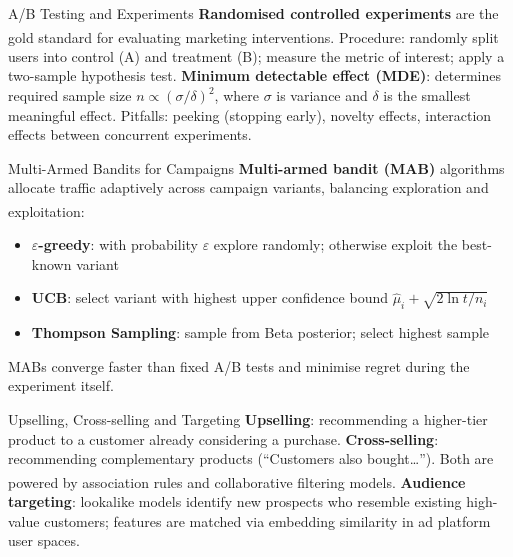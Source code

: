 \begin{v3topic}{A/B Testing and Experiments}
    \textbf{Randomised controlled experiments} are the gold standard for evaluating marketing interventions\textsuperscript{\cite[][pp.~178--183]{chaffeyDigitalBusinessECommerce2019}}.
    Procedure: randomly split users into control (A) and treatment (B); measure the metric of interest; apply a two-sample hypothesis test.
    \textbf{Minimum detectable effect (MDE)}: determines required sample size $n \propto (\sigma / \delta)^2$, where $\sigma$ is variance and $\delta$ is the smallest meaningful effect.
    Pitfalls: peeking (stopping early), novelty effects, interaction effects between concurrent experiments.

\end{v3topic}
\begin{v3topic}{Multi-Armed Bandits for Campaigns}
    \textbf{Multi-armed bandit (MAB)} algorithms allocate traffic adaptively across campaign variants, balancing exploration and exploitation\textsuperscript{\cite[][pp.~458--462]{suttonReinforcementLearningIntroduction2018}}:
    \begin{itemize}
        \item \textbf{$\varepsilon$-greedy}: with probability $\varepsilon$ explore randomly; otherwise exploit the best-known variant
        \item \textbf{UCB}: select variant with highest upper confidence bound $\hat{\mu}_i + \sqrt{2\ln t / n_i}$
        \item \textbf{Thompson Sampling}: sample from Beta posterior; select highest sample
    \end{itemize}
    MABs converge faster than fixed A/B tests and minimise regret during the experiment itself.

\end{v3topic}
\begin{v3topic}{Upselling, Cross-selling and Targeting}
    \textbf{Upselling}: recommending a higher-tier product to a customer already considering a purchase.
    \textbf{Cross-selling}: recommending complementary products (``Customers also bought\ldots'').
    Both are powered by association rules and collaborative filtering models\textsuperscript{\cite[][pp.~185--190]{chaffeyDigitalBusinessECommerce2019}}.
    \textbf{Audience targeting}: lookalike models identify new prospects who resemble existing high-value customers; features are matched via embedding similarity in ad platform user spaces.

\end{v3topic}
